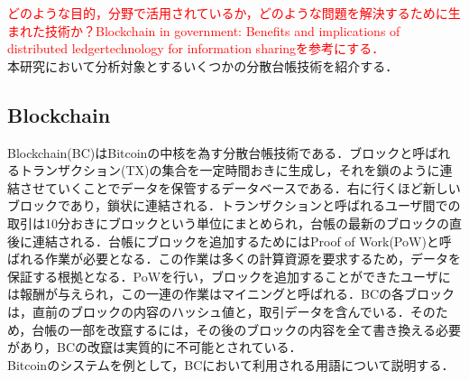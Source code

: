 \documentclass[japanese, macos]{KU2}
\begin{document}
\textcolor{red}{どのような目的，分野で活用されているか，どのような問題を解決するために生まれた技術か？Blockchain in government: Benefits and implications of distributed ledgertechnology for information sharingを参考にする．}\\
本研究において分析対象とするいくつかの分散台帳技術を紹介する．


\subsection{Blockchain}
Blockchain(BC)はBitcoin\cite{nakamoto2008bitcoin}の中核を為す分散台帳技術である．ブロックと呼ばれるトランザクション(TX)の集合を一定時間おきに生成し，それを鎖のように連結させていくことでデータを保管するデータベースである．右に行くほど新しいブロックであり，鎖状に連結される．トランザクションと呼ばれるユーザ間での取引は10分おきにブロックという単位にまとめられ，台帳の最新のブロックの直後に連結される．台帳にブロックを追加するためにはProof of Work(PoW)と呼ばれる作業が必要となる．この作業は多くの計算資源を要求するため，データを保証する根拠となる．PoWを行い，ブロックを追加することができたユーザには報酬が与えられ，この一連の作業はマイニングと呼ばれる．BCの各ブロックは，直前のブロックの内容のハッシュ値と，取引データを含んでいる．そのため，台帳の一部を改竄するには，その後のブロックの内容を全て書き換える必要があり，BCの改竄は実質的に不可能とされている．\\
Bitcoinのシステムを例として，BCにおいて利用される用語について説明する．
\end{document}

